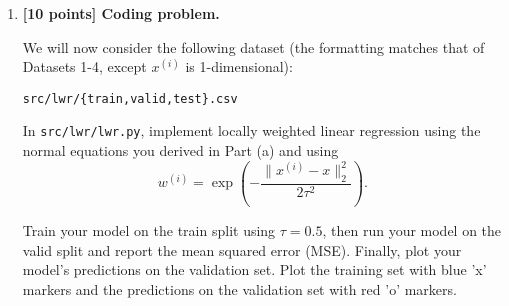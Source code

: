 \documentclass{article}
\begin{document}
\begin{enumerate}[label=\alph*)]
\begin{enumerate}[label=(\roman*.)]
 \end{enumerate}



 
\item \textbf{[10 points] Coding problem.}

We will now consider the following dataset (the formatting matches that of Datasets 1-4, except $x^{(i)}$ is 1-dimensional):

\texttt{src/lwr/\{train,valid,test\}.csv}

In \texttt{src/lwr/lwr.py}, implement locally weighted linear regression using the normal equations you derived in Part (a) and using
\[ w^{(i)} = \exp\left(-\frac{\|x^{(i)} - x\|^2_2}{2\tau^2}\right). \]

Train your model on the train split using $\tau = 0.5$, then run your model on the valid split and report the mean squared error (MSE). Finally, plot your model's predictions on the validation set. Plot the training set with blue 'x' markers and the predictions on the validation set with red 'o' markers. 


\end{enumerate}
\end{document}
